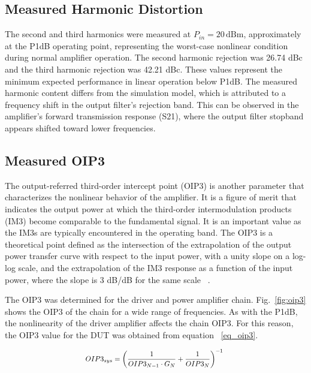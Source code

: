 \subsection{Measured Harmonic Distortion}
The second and third harmonics were measured at $P_{in}=20\,\text{dBm}$, approximately at the P1dB operating point, representing the worst-case nonlinear condition during normal amplifier operation. The second harmonic rejection was 26.74 dBc and the third harmonic rejection was 42.21 dBc. These values represent the minimum expected performance in linear operation below P1dB. The measured harmonic content differs from the simulation model, which is attributed to a frequency shift in the output filter's rejection band. This can be observed in the amplifier's forward transmission response (S21), where the output filter stopband appears shifted toward lower frequencies.


\subsection{Measured OIP3}
The output-referred third-order intercept point (OIP3) is another parameter that characterizes the nonlinear behavior of the amplifier. It is a figure of merit that indicates the output power at which the third-order intermodulation products (IM3) become comparable to the fundamental signal. It is an important value as the IM3s are typically encountered in the operating band. The OIP3 is a theoretical point defined as the intersection of the extrapolation of the output power transfer curve with respect to the input power, with a unity slope on a log-log scale, and the extrapolation of the IM3 response as a function of the input power, where the slope is 3 dB/dB for the same scale ~\cite[pp.~515--517]{Pozar2012}.

The OIP3 was determined for the driver and power amplifier chain. Fig.~\ref{fig:oip3} shows the OIP3 of the chain for a wide range of frequencies. As with the P1dB, the nonlinearity of the driver amplifier affects the chain OIP3. For this reason, the OIP3 value for the DUT was obtained from equation ~\eqref{eq_oip3}.

\begin{equation}
    \scalebox{0.85}{$\displaystyle 
        OIP3_{sys} = \left(\frac{1}{OIP3_{N-1} \cdot G_N} + \frac{1}{OIP3_N}\right)^{-1}$
    }
    \label{eq_oip3}
\end{equation}

